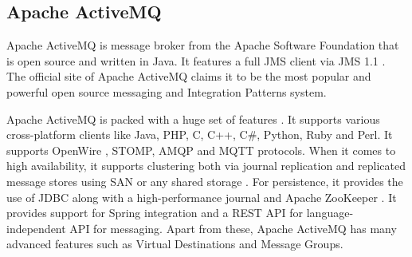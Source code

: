 \subsection{Apache ActiveMQ}

Apache ActiveMQ is message broker from the Apache Software Foundation that is open source and written in Java. It features a full JMS client via JMS 1.1 \parencite{snyderintroduction}. The official site of Apache ActiveMQ claims it to be the most popular and powerful open source messaging and Integration Patterns system. 

Apache ActiveMQ is packed with a huge set of features \parencite{activemq_official_site}. It supports various cross-platform clients like Java, PHP, C, C++, C\#, Python, Ruby and Perl. It supports OpenWire \parencite{openwire}, STOMP, AMQP and MQTT protocols. When it comes to high availability, it supports clustering both via journal replication and replicated message stores using SAN \parencite{Aizikowitz:2005:CPM:1162708.1163129} or any shared storage \parencite{schmuck2002gpfs}. For persistence, it provides the use of JDBC along with a high-performance journal and Apache ZooKeeper \parencite{schmuck2002gpfs}. It provides support for Spring integration and a REST API for language-independent API for messaging. Apart from these, Apache ActiveMQ has many advanced features such as Virtual Destinations and Message Groups.

